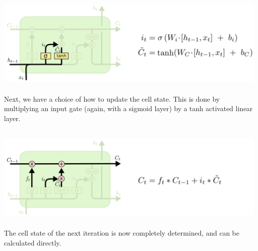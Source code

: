 \documentclass[xetex,mathserif,serif,aspectratio=169]{beamer}
\begin{document}
\begin{frame}[fragile] \frametitle{} \oldB \small

\begin{center}
\includegraphics[height=4.5cm]{img/cloah10.png}
\end{center}

Next, we have a choice of how to update the cell state. This
is done by multiplying an input gate (again, with a
sigmoid layer) by a tanh activated linear layer.

\end{frame}

\begin{frame}[fragile] \frametitle{} \oldB \small

\begin{center}
\includegraphics[height=4.5cm]{img/cloah11.png}
\end{center}

The cell state of the next iteration is now completely
determined, and can be calculated directly.

\end{frame}
\end{document}
